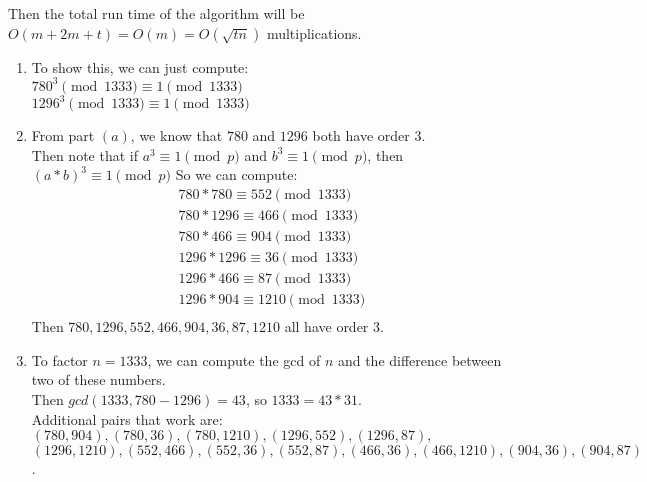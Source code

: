 \documentclass{assignment}
\begin{document}
\begin{problemlist}
\begin{problem}
\begin{enumerate}
    Then the total run time of the algorithm will be $O(m+2m+t)=O(m)=O(\sqrt{tn})$ multiplications.\\
    
    
  \end{enumerate}
\end{problem}

\pbitem
\begin{problem}
  \begin{enumerate}
  \item
    To show this, we can just compute:\\
    $780^3\pmod{1333} \equiv 1\pmod{1333}$\\
    $1296^3\pmod{1333} \equiv 1\pmod{1333}$
  \item
    From part $(a)$, we know that $780$ and $1296$ both have order $3$.\\
    Then note that if $a^3 \equiv 1\pmod{p}$ and $b^3 \equiv 1\pmod{p}$, then $(a*b)^3 \equiv 1\pmod{p}$
    So we can compute:
    \begin{align*}
      780*780 \equiv 552\pmod{1333}\\
      780*1296 \equiv 466\pmod{1333}\\
      780*466 \equiv 904\pmod{1333}\\
      1296*1296 \equiv 36\pmod{1333}\\
      1296*466 \equiv 87\pmod{1333}\\
      1296*904 \equiv 1210\pmod{1333}\\
    \end{align*}
    Then $780,1296,552,466,904,36,87,1210$ all have order $3$.
  \item
    To factor $n=1333$, we can compute the gcd of $n$ and the difference between two of these numbers.\\
    Then $gcd(1333, 780-1296) = 43$, so $1333=43*31$.\\
    Additional pairs that work are: $(780,904), (780,36), (780,1210), (1296,552), (1296,87),$ $(1296,1210), (552,466), (552,36), (552,87), (466,36), (466,1210), (904,36), (904,87)$.\\
  \end{enumerate}
\end{problem}


\end{problemlist}
\end{document}
